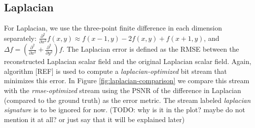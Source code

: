\subsection{Laplacian}

For Laplacian, we use the three-point finite difference in each dimension separately:
$\frac{{\partial}^2}{\partial{x^2}}f(x,y) \approx f(x-1,y)-2f(x,y)+f(x+1,y)$, and $\Delta
f=(\frac{{\partial}^2}{\partial{x^2}}+\frac{{\partial}^2}{\partial{y^2}})f$. The Laplacian error is
defined as the RMSE between the reconstructed Laplacian scalar field and the original Laplacian
scalar field. Again, algorithm [REF] is used to compute a \emph{laplacian-optimized} bit stream that
minimizes this error. In Figure \ref{fig:laplacian-comparison} we compare this stream with the
\emph{rmse-optimized} stream using the PSNR of the difference in Laplacian (compared to the
ground truth) as the error metric. The stream labeled \emph{laplacian signature} is to be ignored for
now. (TODO: why is it in the plot? maybe do not mention it at all? or just say that it will be explained later)

